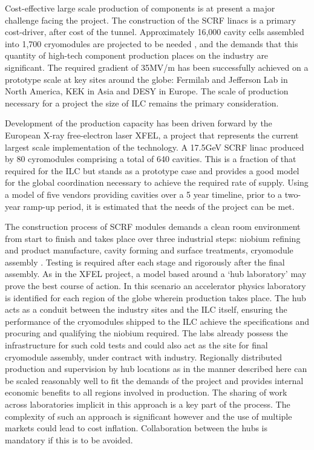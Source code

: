 Cost-effective large scale production of components is at present a major challenge facing the project. The construction of the SCRF linacs is a primary cost-driver, after cost of the tunnel. Approximately 16,000 cavity cells assembled into 1,700 cryomodules are projected to be needed \cite{ILC:PIPReport}, and the demands that this quantity of high-tech component production places on the industry are significant. The required gradient of 35MV/m has been successfully achieved on a prototype scale at key sites around the globe: Fermilab and Jefferson Lab in North America, KEK in Asia and DESY in Europe. The scale of production necessary for a project the size of ILC remains the primary consideration.

Development of the production capacity has been driven forward by the European X-ray free-electron laser XFEL, a project that represents the current largest scale implementation of the technology. A 17.5GeV SCRF linac produced by 80 cyromodules comprising a total of 640 cavities. This is a fraction of that required for the ILC but stands as a prototype case and provides a good model for the global coordination necessary to achieve the required rate of supply. Using a model of five vendors providing cavities over a 5 year timeline, prior to a two-year ramp-up period, it is estimated that the needs of the project can be met.

The construction process of SCRF modules demands a clean room environment from start to finish and takes place over three industrial steps: niobium refining and product manufacture, cavity forming and surface treatments, cryomodule assembly \cite{IPAC:Industrialisation}. Testing is required after each stage and rigorously after the final assembly. As in the XFEL project, a model based around a `hub laboratory' may prove the best course of action. In this scenario an accelerator physics laboratory is identified for each region of the globe wherein production takes place. The hub acts as a conduit between the industry sites and the ILC itself, ensuring the performance of the cryomodules shipped to the ILC achieve the specifications and procuring and qualifying the niobium required. The labs already possess the infrastructure for such cold tests and could also act as the site for final cryomodule assembly, under contract with industry. Regionally distributed production and supervision by hub locations as in the manner described here can be scaled reasonably well to fit the demands of the project and provides internal economic benefits to all regions involved in production. The sharing of work across laboratories implicit in this approach is a key part of the process. The complexity of such an approach is significant however and the use of multiple markets could lead to cost inflation. Collaboration between the hubs is mandatory if this is to be avoided.

